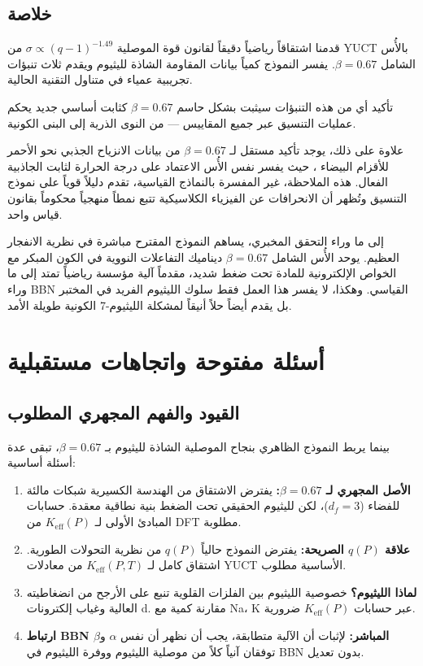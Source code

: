 \documentclass[12pt,a4paper]{article}
\newcommand{\Ke}{K_{\mathrm{eff}}}
\newcommand{\df}{d_{\!f}}
\newcommand{\alp}{\alpha}
\theoremstyle{remark}
\begin{document}
	\subsection{خلاصة}
	
	قدمنا اشتقاقاً رياضياً دقيقاً لقانون قوة الموصلية \(\sigma \propto (q-1)^{-1.49}\) من YUCT بالأُس الشامل \(\beta = 0.67\). يفسر النموذج كمياً بيانات المقاومة الشاذة لليثيوم ويقدم ثلاث تنبؤات تجريبية عمياء في متناول التقنية الحالية.
	
	تأكيد أي من هذه التنبؤات سيثبت بشكل حاسم \(\beta = 0.67\) كثابت أساسي جديد يحكم عمليات التنسيق عبر جميع المقاييس — من النوى الذرية إلى البنى الكونية.
	
	علاوة على ذلك، يوجد تأكيد مستقل لـ \(\beta = 0.67\) من بيانات الانزياح الجذبي نحو الأحمر للأقزام البيضاء \cite{Crumpler2024}، حيث يفسر نفس الأُس الاعتماد على درجة الحرارة لثابت الجاذبية الفعال. هذه الملاحظة، غير المفسرة بالنماذج القياسية، تقدم دليلاً قوياً على نموذج التنسيق وتُظهر أن الانحرافات عن الفيزياء الكلاسيكية تتبع نمطاً منهجياً محكوماً بقانون قياس واحد.
	
	إلى ما وراء التحقق المخبري، يساهم النموذج المقترح مباشرة في نظرية الانفجار العظيم. يوحد الأُس الشامل \(\beta = 0.67\) ديناميك التفاعلات النووية في الكون المبكر مع الخواص الإلكترونية للمادة تحت ضغط شديد، مقدماً آلية مؤسسة رياضياً تمتد إلى ما وراء BBN القياسي. وهكذا، لا يفسر هذا العمل فقط سلوك الليثيوم الفريد في المختبر بل يقدم أيضاً حلاً أنيقاً لمشكلة الليثيوم-7 الكونية طويلة الأمد.
	
	\section{أسئلة مفتوحة واتجاهات مستقبلية}
	\label{sec:open-questions}
	
	\subsection{القيود والفهم المجهري المطلوب}
	
	بينما يربط النموذج الظاهري بنجاح الموصلية الشاذة لليثيوم بـ \(\beta = 0.67\)، تبقى عدة أسئلة أساسية:
	
	\begin{enumerate}
		\item \textbf{الأصل المجهري لـ \(\beta = 0.67\):} يفترض الاشتقاق من الهندسة الكسيرية شبكات مالئة للفضاء (\(\df = 3\))، لكن لليثيوم الحقيقي تحت الضغط بنية نطاقية معقدة. حسابات المبادئ الأولى لـ \(\Ke(P)\) من DFT مطلوبة.
		
		\item \textbf{علاقة \(q(P)\) الصريحة:} يفترض النموذج حالياً \(q(P)\) من نظرية التحولات الطورية. اشتقاق كامل لـ \(\Ke(P,T)\) من معادلات YUCT الأساسية مطلوب.
		
		\item \textbf{لماذا الليثيوم؟} خصوصية الليثيوم بين الفلزات القلوية تنبع على الأرجح من انضغاطيته العالية وغياب إلكترونات d. مقارنة كمية مع Na، K عبر حسابات \(\Ke(P)\) ضرورية.
		
		\item \textbf{ارتباط BBN المباشر:} لإثبات أن الآلية متطابقة، يجب أن نظهر أن نفس \(\alp\) و\(\beta\) توفقان آنياً كلاً من موصلية الليثيوم ووفرة الليثيوم في BBN بدون تعديل.
	\end{enumerate}
	
\end{document}
